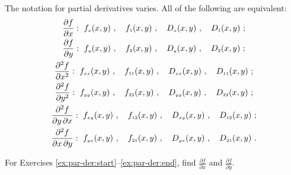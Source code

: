 The notation for partial derivatives varies. 
All of the following are equivalent:
\begin{gather*}
 \dfrac{\partial f}{\partial x}:~ f_{\scriptscriptstyle x}(x,y) ~, \quad f_{\scriptscriptstyle 1}(x,y) ~, \quad D_{\scriptscriptstyle x}(x,y) ~, \quad
  D_{\scriptscriptstyle 1}(x,y)~;
  \\
 \dfrac{\partial f}{\partial y}:~ f_{\scriptscriptstyle y}(x,y) ~, \quad f_{\scriptscriptstyle 2}(x,y) ~, \quad D_{\scriptscriptstyle y}(x,y) ~, \quad
  D_{\scriptscriptstyle 2}(x,y)~;
  \\
 \dfrac{\partial^2 f}{\partial x^2}:~ f_{\scriptscriptstyle xx}(x,y) ~, \quad f_{\scriptscriptstyle 11}(x,y) ~, \quad D_{\scriptscriptstyle xx}(x,y) ~, \quad
  D_{\scriptscriptstyle 11}(x,y)~;
  \\
 \dfrac{\partial^2 f}{\partial y^2}:~ f_{\scriptscriptstyle yy}(x,y) ~, \quad f_{\scriptscriptstyle 22}(x,y) ~, \quad D_{\scriptscriptstyle yy}(x,y) ~, \quad
  D_{\scriptscriptstyle 22}(x,y)~;
  \\
 \dfrac{\partial^2 f}{\partial y \, \partial x}: ~ f_{\scriptscriptstyle xy}(x,y) ~, \quad f_{\scriptscriptstyle 12}(x,y) ~, \quad
  D_{\scriptscriptstyle xy}(x,y) ~, \quad
  D_{\scriptscriptstyle 12}(x,y)~;
  \\
 \dfrac{\partial^2 f}{\partial x \, \partial y}: ~ f_{\scriptscriptstyle yx}(x,y) ~, \quad f_{\scriptscriptstyle 21}(x,y) ~, \quad
  D_{\scriptscriptstyle yx}(x,y) ~, \quad
  D_{\scriptscriptstyle 21}(x,y)~.
\end{gather*}
\centerline{}\label{sec2dot2}
\par\noindent For Exercises \ref{ex:par-der:start}--\ref{ex:par-der:end}, find $\frac{\partial f}{\partial x}$ and $\frac{\partial f}{\partial y}$.
